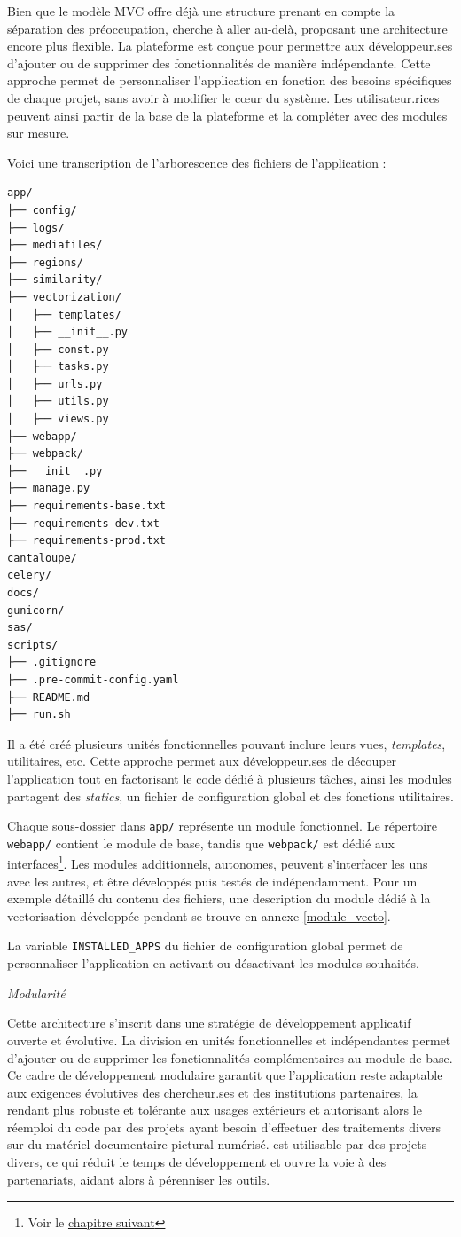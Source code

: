 Bien que le modèle MVC offre déjà une structure prenant en compte la
séparation des préoccupation, \eida cherche à aller au-delà, proposant
une architecture encore plus flexible. La plateforme est conçue pour
permettre aux développeur.ses d'ajouter ou de supprimer des fonctionnalités
de manière indépendante. Cette approche permet de personnaliser
l'application en fonction des besoins spécifiques de chaque projet, sans
avoir à modifier le cœur du système. Les utilisateur.rices peuvent ainsi
partir de la base de la plateforme et la compléter avec des modules sur
mesure.

Voici une transcription de l'arborescence des fichiers de l'application
:

\begin{verbatim}
app/
├── config/
├── logs/
├── mediafiles/
├── regions/
├── similarity/
├── vectorization/
│   ├── templates/
│   ├── __init__.py
│   ├── const.py
│   ├── tasks.py
│   ├── urls.py
│   ├── utils.py
│   ├── views.py
├── webapp/
├── webpack/
├── __init__.py
├── manage.py
├── requirements-base.txt
├── requirements-dev.txt
├── requirements-prod.txt
cantaloupe/
celery/
docs/
gunicorn/
sas/
scripts/
├── .gitignore
├── .pre-commit-config.yaml
├── README.md
├── run.sh
\end{verbatim}

Il a été créé plusieurs unités fonctionnelles pouvant inclure leurs vues, \textit{templates}, utilitaires, etc. Cette approche
permet aux développeur.ses de découper l'application tout en factorisant le code dédié à
plusieurs tâches, ainsi les modules partagent des \textit{statics}, un fichier
de configuration global et des fonctions utilitaires.

Chaque sous-dossier dans \texttt{app/} représente un module fonctionnel. Le
répertoire \texttt{webapp/} contient le module de base, tandis que \texttt{webpack/} est
dédié aux interfaces\footnote{Voir le \hyperlink{chapitre-8-interfaces}{chapitre suivant}}. Les modules
additionnels, autonomes, peuvent s'interfacer les uns avec les autres,
et être développés puis testés de indépendamment. Pour un exemple
détaillé du contenu des fichiers, une description du module dédié à
la vectorisation développée pendant se trouve en annexe \ref{module_vecto}. 

La variable \texttt{INSTALLED\_APPS} du fichier de configuration global permet de
personnaliser l'application en activant ou désactivant les modules
souhaités.

\emph{Modularité}

Cette architecture s'inscrit dans une stratégie de développement
applicatif ouverte et évolutive. La division en unités fonctionnelles et
indépendantes permet d'ajouter ou de supprimer les fonctionnalités
complémentaires au module de base. Ce cadre de développement modulaire
garantit que l'application reste adaptable aux exigences évolutives des
chercheur.ses et des institutions partenaires, la rendant plus robuste et
tolérante aux usages extérieurs et autorisant alors le réemploi du code
par des projets ayant besoin d'effectuer des traitements divers sur
du matériel documentaire pictural numérisé. \aikon est utilisable par des
projets divers, ce qui réduit le temps de développement et ouvre la voie
à des partenariats, aidant alors à pérenniser les outils.

